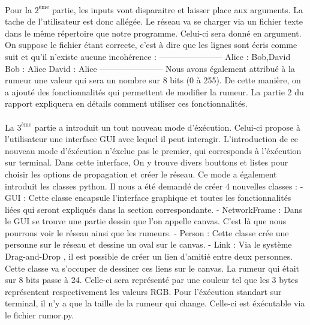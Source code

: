 \documentclass[a4paper,11pt]{article}
\begin{document}
\paragraph{}
{Pour la $2^{\textrm{ème}}$ partie, les inputs vont disparaitre et laisser place aux arguments. La tache de l'utilisateur est donc allégée.
Le réseau va se charger via un fichier texte dans le même répertoire que notre programme. Celui-ci sera donné en argument. 
On suppose le fichier étant correcte, 
c'est à dire que les lignes sont écris comme suit et qu'il n'existe aucune incohérence :
\newline -----------------------
\newline Alice : Bob,David
\newline Bob : Alice
\newline David : Alice
\newline -----------------------
\newline Nous avons également attribué à la rumeur une valeur qui sera un nombre sur 8 bits (0 à 255). De cette manière, on a ajouté des fonctionnalités
 qui permettent de modifier la rumeur. La partie 2 du rapport expliquera en détails comment utiliser ces fonctionnalités.}
\paragraph{}
{La $3^{\textrm{ème}}$ partie a introduit un tout nouveau mode d'éxécution. Celui-ci propose à l'utilisateur une interface GUI avec lequel il peut interagir.
L'introduction de ce nouveau mode d'éxécution n'éxclue pas le premier, qui corresponds à l'éxécution sur terminal. 
Dans cette interface, On y trouve divers bouttons et listes pour choisir les options de propagation et créer le réseau.
Ce mode a également introduit les classes python. Il nous a été demandé de créer 4 nouvelles classes :
\newline - GUI : Cette classe encapsule l'interface graphique et toutes les fonctionnalités liées qui seront expliqués dans la section correspondante.
\newline - NetworkFrame : Dans le GUI se trouve une partie dessin que l'on appelle canvas. C'est là que nous pourrons voir le réseau ainsi que les rumeurs.
\newline - Person : Cette classe crée une personne sur le réseau et dessine un oval sur le canvas.
\newline - Link : Via le système Drag-and-Drop , il est possible de créer un lien d'amitié entre deux personnes. Cette classe va s'occuper de dessiner ces liens sur le canvas.
\newline La rumeur qui était sur 8 bits passe à 24. Celle-ci sera représenté par une couleur tel que les  3 bytes représentent respectivement les valeurs RGB. 
Pour l'éxécution standart sur terminal, il n'y a que la taille de la rumeur qui change. Celle-ci est éxécutable via le fichier rumor.py.}
\end{document}
